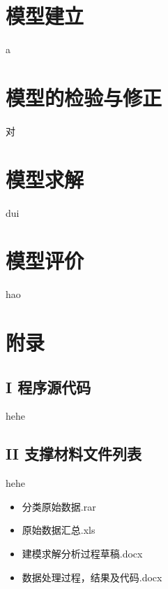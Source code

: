 \documentclass[UTF8]{article}
\begin{document}
	\section{模型建立}
		a
	\section{模型的检验与修正}
		对
	\section{模型求解}
		dui
	\section{模型评价}
		hao
	
	
	\section*{附录}
	\subsection*{I 程序源代码}
		hehe
	\subsection*{II 支撑材料文件列表}
		hehe
	\begin{itemize}
		\item 分类原始数据.rar
		\item 原始数据汇总.xls
		\item 建模求解分析过程草稿.docx
		\item 数据处理过程，结果及代码.docx
	\end{itemize}
\end{document}
